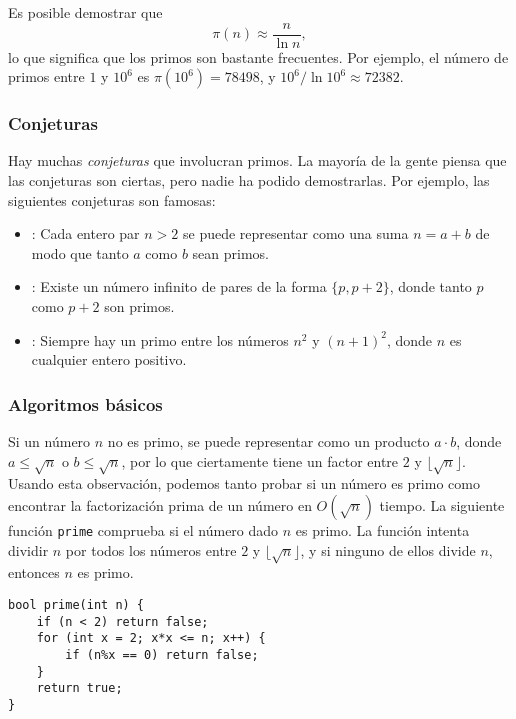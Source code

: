 Es posible demostrar que
\[\pi(n) \approx \frac{n}{\ln n},\]
lo que significa que los primos son bastante frecuentes.
Por ejemplo, el número de primos entre
$1$ y $10^6$ es $\pi(10^6)=78498$,
y $10^6 / \ln 10^6 \approx 72382$.

\subsubsection{Conjeturas}

Hay muchas \emph{conjeturas} que involucran primos.
La mayoría de la gente piensa que las conjeturas son ciertas,
pero nadie ha podido demostrarlas.
Por ejemplo, las siguientes conjeturas son famosas:

\begin{itemize}
\item {}:
Cada entero par $n>2$ se puede representar como una
suma $n=a+b$ de modo que tanto $a$ como $b$ sean primos.
\item {}:
Existe un número infinito de pares
de la forma $\{p,p+2\}$,
donde tanto $p$ como $p+2$ son primos.
\item {}:
Siempre hay un primo entre los números
$n^2$ y $(n+1)^2$, donde $n$ es cualquier entero positivo.
\end{itemize}

\subsubsection{Algoritmos básicos}

Si un número $n$ no es primo,
se puede representar como un producto $a \cdot b$,
donde $a \le \sqrt n$ o $b \le \sqrt n$,
por lo que ciertamente tiene un factor entre $2$ y $\lfloor \sqrt n \rfloor$.
Usando esta observación, podemos tanto probar
si un número es primo como encontrar la factorización prima
de un número en $O(\sqrt n)$ tiempo.
La siguiente función \texttt{prime} comprueba
si el número dado $n$ es primo.
La función intenta dividir $n$ por
todos los números entre $2$ y $\lfloor \sqrt n \rfloor$,
y si ninguno de ellos divide $n$, entonces $n$ es primo.

\begin{lstlisting}
bool prime(int n) {
    if (n < 2) return false;
    for (int x = 2; x*x <= n; x++) {
        if (n%x == 0) return false;
    }
    return true;
}
\end{lstlisting}

